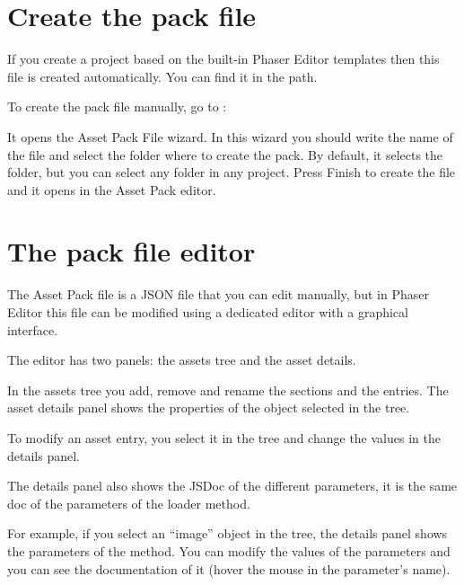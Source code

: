 \documentclass[letterpaper,10pt,english]{sphinxmanual}
\begin{document}
\section{Create the pack file}
\label{\detokenize{assets_manager:create-the-pack-file}}
If you create a project based on the built-in Phaser Editor templates then this file is created automatically. You can find it in the  path.

To create the pack file manually, go to :

\noindent{}

It opens the Asset Pack File wizard. In this wizard you should write the name of the file and select the folder where to create the pack. By default, it selects the  folder, but you can select any folder in any project. Press Finish to create the file and it opens in the Asset Pack editor.

\noindent{}


\section{The pack file editor}
\label{\detokenize{assets_manager:the-pack-file-editor}}
The Asset Pack file is a JSON file that you can edit manually, but in Phaser Editor this file can be modified using a dedicated editor with a graphical interface.

The editor has two panels: the assets tree and the asset details.

In the assets tree you add, remove and rename the sections and the entries. The asset details panel shows the properties of the object selected in the tree.

To modify an asset entry, you select it in the tree and change the values in the details panel.

The details panel also shows the JSDoc of the different parameters, it is the same doc of the parameters of the loader method.

For example, if you select an “image” object in the tree, the details panel shows the parameters of the  method. You can modify the values of the parameters and you can see the documentation of it (hover the mouse in the parameter’s name).

\noindent{}
\end{document}
